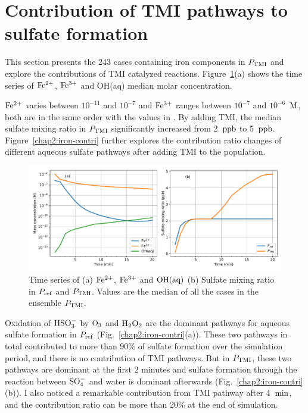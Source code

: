 \documentclass[edeposit,fullpage]{uiucthesis2009}
\makeatletter
\DeclareRobustCommand*\unit[1]
 {\ensuremath{%
   {\thinmuskip3mu\relax
    \def\mu{\text{\textmu}}\def~{\,}%
    \ifx\f@series\testbx\mathbf{#1}\else\mathrm{#1}\fi}}}
\makeatother
\begin{document}
\section{Contribution of TMI pathways to sulfate formation} 
\label{chap2.5}
This section presents the 243 cases containing iron components in
$P_{\rm TMI}$ and explore the contributions of TMI catalyzed
reactions. Figure~\ref{chap2:iron-conc}(a) shows the time series of
$\rm Fe^{2+}$, $\rm Fe^{3+}$ and OH(aq) median molar concentration.

$\rm Fe^{2+}$ varies between $10^{-11}$ and $10^{-7}$ and $\rm
Fe^{3+}$ ranges between $10^{-7}$ and $10^{-6}$~\unit{M}, both are in
the same order with the values in \citet{Deguillaume2005}. By adding
TMI, the median sulfate mixing ratio in $P_{\rm TMI}$ significantly
increased from 2~\unit{ppb} to
5~\unit{ppb}. Figure~\ref{chap2:iron-contri} further explores the
contribution ratio changes of different aqueous sulfate pathways after
adding TMI to the population.

\begin{figure}[ht]
    \centering \includegraphics[scale=0.53]{chap2_figs/chap2_with_tmi_fixOH_mass.pdf}
    \caption{Time series of (a) $\rm Fe^{2+}$, $\rm Fe^{3+}$ and $\rm
      OH(aq)$ (b) Sulfate mixing ratio in $P_{\rm ref}$ and $P_{\rm
        TMI}$. Values are the median of all the cases in the ensemble
      $P_{\rm TMI}$. }
    \label{chap2:iron-conc}
\end{figure}

Oxidation of $\rm HSO_3^-$ by $\rm O_3$ and $\rm H_2O_2$ are the
dominant pathways for aqueous sulfate formation in $P_{\rm ref}$
(Fig.~\ref{chap2:iron-contri}(a)). These two pathways in total
contributed to more than 90\% of sulfate formation over the simulation
period, and there is no contribution of TMI
pathways. But in $P_{\rm TMI}$, these two pathways are dominant at the
first 2 minutes and sulfate formation through the reaction between
$\rm SO_4^-$ and water is dominant afterwards
(Fig.~\ref{chap2:iron-contri}(b)). I also noticed a remarkable
contribution from TMI pathway after 4~\unit{min}, and the contribution
ratio can be more than 20\% at the end of simulation.
\end{document}
